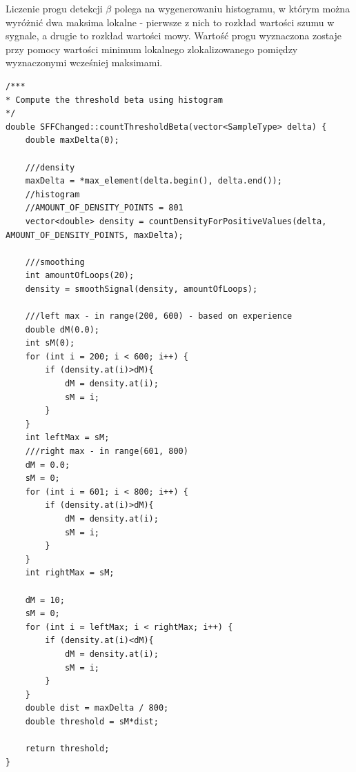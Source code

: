 \documentclass[eng,printmode]{mgr}
\begin{document}
Liczenie progu detekcji $\beta$ polega na wygenerowaniu histogramu, w którym można wyróżnić dwa maksima lokalne - pierwsze z nich to rozkład wartości szumu w sygnale, a drugie to rozkład wartości mowy. Wartość progu wyznaczona zostaje przy pomocy wartości minimum lokalnego zlokalizowanego pomiędzy wyznaczonymi wcześniej maksimami.
\lstset{language=C++,basicstyle=\scriptsize}
\begin{lstlisting}
/***
* Compute the threshold beta using histogram
*/
double SFFChanged::countThresholdBeta(vector<SampleType> delta) {
	double maxDelta(0);
	
	///density
	maxDelta = *max_element(delta.begin(), delta.end());
	//histogram
	//AMOUNT_OF_DENSITY_POINTS = 801
	vector<double> density = countDensityForPositiveValues(delta, AMOUNT_OF_DENSITY_POINTS, maxDelta);
	
	///smoothing
	int amountOfLoops(20);
	density = smoothSignal(density, amountOfLoops);
	
	///left max - in range(200, 600) - based on experience
	double dM(0.0);
	int sM(0);
	for (int i = 200; i < 600; i++) {
		if (density.at(i)>dM){
			dM = density.at(i);
			sM = i;
		}
	}
	int leftMax = sM;
	///right max - in range(601, 800)
	dM = 0.0;
	sM = 0;
	for (int i = 601; i < 800; i++) {
		if (density.at(i)>dM){
			dM = density.at(i);
			sM = i;
		}
	}
	int rightMax = sM;
	
	dM = 10;
	sM = 0;
	for (int i = leftMax; i < rightMax; i++) {
		if (density.at(i)<dM){
			dM = density.at(i);
			sM = i;
		}
	}
	double dist = maxDelta / 800;
	double threshold = sM*dist;
	
	return threshold;
}


\end{lstlisting}\vspace{5mm}
\end{document}
